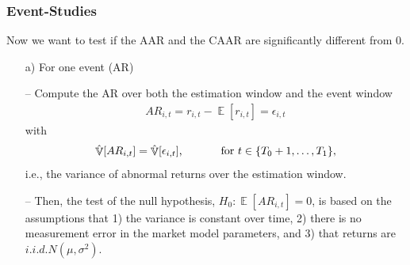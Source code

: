\documentclass[xcolor=dvipsnames, english, 8pt]{beamer}
\DeclareMathOperator{\E}{\mathbb{E}}
\DeclareMathOperator{\V}{\mathbb{V}}
\begin{document}
        \begin{frame}
            \frametitle{Event-Studies}
        Now we want to test if the {\color{ubRed}AAR} and the {\color{ubRed}CAAR} are significantly different from 0.\vspace{0.25cm}\\
        \begin{enumerate}
            \item[a)] For one event (AR)\vspace{0.25cm}\\

                \item[--] Compute the AR over both the {\color{ubRed}estimation window} and the {\color{ubRed}event window}
                \begin{align}
                    AR_{i,t} = r_{i,t} - \E[r_{i,t}] = \epsilon_{i,t}
                \end{align}
                with
                \begin{align}
                    \hat{\V}[AR_{i,t}] = \hat{\V}[\epsilon_{i,t}] \text{, \hspace{1cm} for } t\in\{T_0+1,\hdots,T_1\},
                \end{align}
                i.e., the variance of abnormal returns over the {\color{ubRed} estimation window}.
                \item[--] Then, the test of the null hypothesis, $H_0:\E[AR_{i,t}]=0$, is based on the assumptions that 1) the variance is constant over time, 2) there is no measurement error in the market model parameters, and 3) that returns are $i.i.d.N(\mu,\sigma^2)$.

        \end{enumerate}
        \end{frame}
\end{document}
